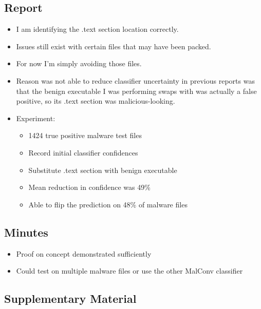 \documentclass{article}
\begin{document}
\subsection*{Report}
\begin{itemize}
	\item I am identifying the .text section location correctly.
	\item Issues still exist with certain files that may have been packed.
	\item For now I'm simply avoiding those files.
	\item Reason was not able to reduce classifier uncertainty in previous reports was that the benign executable I was performing swaps with was actually a false positive, so its .text section was malicious-looking.
	\item Experiment:
	\begin{itemize}
		\item 1424 true positive malware test files
		\item Record initial classifier confidences
		\item Substitute .text section with benign executable
		\item Mean reduction in confidence was 49\%
		\item Able to flip the prediction on 48\% of malware files
	\end{itemize}
\end{itemize}

\subsection*{Minutes}
\begin{itemize}
	\item Proof on concept demonstrated sufficiently
	\item Could test on multiple malware files or use the other MalConv classifier
\end{itemize}

\pagebreak

\subsection*{Supplementary Material}
\end{document}
